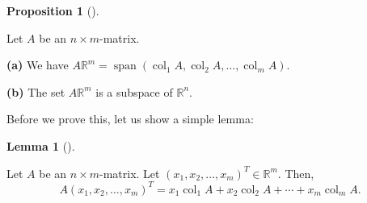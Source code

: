 \documentclass[numbers=enddot,12pt,final,onecolumn,notitlepage]{scrartcl}%
\theoremstyle{definition}
\newtheorem{lem}[theo]{Lemma}
\newenvironment{lemma}[1][]
{\begin{lem}[#1]\begin{leftbar}}
{\end{leftbar}\end{lem}}
\newtheorem{prop}[theo]{Proposition}
\newenvironment{proposition}[1][]
{\begin{prop}[#1]\begin{leftbar}}
{\end{leftbar}\end{prop}}
\begin{document}
\begin{proposition}
\label{prop.subspace.Im}Let $A$ be an $n\times m$-matrix.

\textbf{(a)} We have $A\mathbb{R}^{m}=\operatorname{span}\left(
\operatorname*{col}\nolimits_{1}A,\operatorname*{col}\nolimits_{2}%
A,\ldots,\operatorname*{col}\nolimits_{m}A\right)  $.

\textbf{(b)} The set $A\mathbb{R}^{m}$ is a subspace of $\mathbb{R}^{n}$.
\end{proposition}

Before we prove this, let us show a simple lemma:

\begin{lemma}
\label{lem.subspace.Im.Ax}Let $A$ be an $n\times m$-matrix. Let $\left(
x_{1},x_{2},\ldots,x_{m}\right)  ^{T}\in\mathbb{R}^{m}$. Then,%
\[
A\left(  x_{1},x_{2},\ldots,x_{m}\right)  ^{T}=x_{1}\operatorname*{col}%
\nolimits_{1}A+x_{2}\operatorname*{col}\nolimits_{2}A+\cdots+x_{m}%
\operatorname*{col}\nolimits_{m}A.
\]

\end{lemma}
\end{document}
